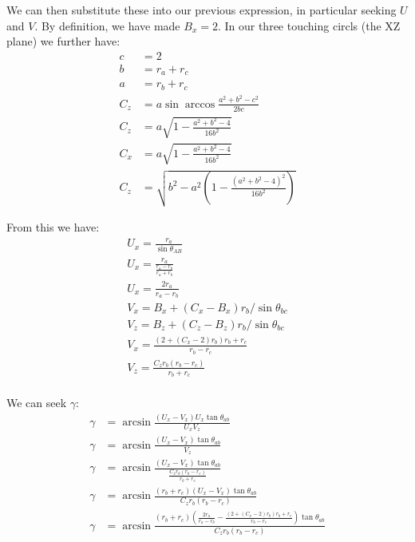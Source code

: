 \documentclass{article}
\begin{document}
We can then substitute these into our previous expression, in particular
seeking $U$ and $V$. By definition, we have made $B_x = 2$.
In our three touching circls (the XZ plane) we further have:
\begin{align}
  c &= 2 \\
  b &= r_a + r_c \\
  a &= r_b + r_c \\
  C_z &= a \sin{\arccos{\frac{a^2 + b^2 - c^2}{2bc}}} \\
  C_z &= a \sqrt{1 - \frac{a^2 + b^2 - 4}{16b^2}} \\
  C_x &= a \sqrt{1 - \frac{a^2 + b^2 - 4}{16b^2}} \\
  C_z &= \sqrt{b^2 - a^2 (1 - \frac{(a^2 + b^2 - 4)^2}{16 b^2})}
\end{align}

From this we have:
\begin{align}
  U_x = \frac{r_a}{\sin{\theta_{AB}}} \\
  U_x = \frac{r_a}{\frac{r_a - r_b}{r_a + r_b}} \\
  U_x = \frac{2 r_a}{r_a - r_b} \\
  V_x = B_x + (C_x - B_x) r_b / \sin{\theta_{bc}} \\
  V_z = B_z + (C_z - B_z) r_b / \sin{\theta_{bc}} \\
  V_x =   \frac{(2 + (C_x - 2) r_b) r_b + r_c}{r_b - r_c} \\
  V_z =  \frac{C_z r_b (r_b - r_c)}{r_b + r_c} \\
\end{align}

We can seek $\gamma$:
\begin{align}
  \gamma &= \arcsin{\frac{(U_x - V_x)U_x\tan{\theta_{ab}}}{U_xV_z}} \\
  \gamma &= \arcsin{\frac{(U_x - V_x)\tan{\theta_{ab}}}{V_z}} \\
  \gamma &= \arcsin{\frac{(U_x - V_x)\tan{\theta_{ab}}}{\frac{C_z r_b (r_b - r_c)}{r_b + r_c}}} \\
  \gamma &= \arcsin{\frac{(r_b + r_c)(U_x - V_x)\tan{\theta_{ab}}}{C_z r_b (r_b - r_c)}} \\
  \gamma &= \arcsin{\frac{(r_b + r_c)(\frac{2 r_a}{r_a - r_b} - \frac{(2 + (C_x - 2) r_b) r_b + r_c}{r_b - r_c})\tan{\theta_{ab}}}{C_z r_b (r_b - r_c)}} \\
\end{align}




\end{document}
